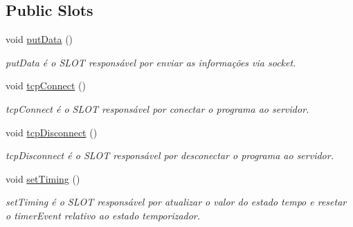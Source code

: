\subsection*{Public Slots}
\begin{DoxyCompactItemize}
\item 
\mbox{\label{class_main_window_afdfeb13ec363b0eb8ecacaf0aa13b605}} 
void \mbox{\hyperlink{class_main_window_afdfeb13ec363b0eb8ecacaf0aa13b605}{put\+Data}} ()
\begin{DoxyCompactList}\small\item\em put\+Data é o S\+L\+OT responsável por enviar as informações via socket. \end{DoxyCompactList}\item 
\mbox{\label{class_main_window_ac5b669957c442b6eb68573dacfce33e1}} 
void \mbox{\hyperlink{class_main_window_ac5b669957c442b6eb68573dacfce33e1}{tcp\+Connect}} ()
\begin{DoxyCompactList}\small\item\em tcp\+Connect é o S\+L\+OT responsável por conectar o programa ao servidor. \end{DoxyCompactList}\item 
\mbox{\label{class_main_window_a4d22c4c7afc7ba0a2fa4c70515c85dda}} 
void \mbox{\hyperlink{class_main_window_a4d22c4c7afc7ba0a2fa4c70515c85dda}{tcp\+Disconnect}} ()
\begin{DoxyCompactList}\small\item\em tcp\+Disconnect é o S\+L\+OT responsável por desconectar o programa ao servidor. \end{DoxyCompactList}\item 
\mbox{\label{class_main_window_a380872c4aa4095322c798c8ea0ed357e}} 
void \mbox{\hyperlink{class_main_window_a380872c4aa4095322c798c8ea0ed357e}{set\+Timing}} ()
\begin{DoxyCompactList}\small\item\em set\+Timing é o S\+L\+OT responsável por atualizar o valor do estado tempo e resetar o timer\+Event relativo ao estado temporizador. \end{DoxyCompactList}\item 
\mbox{\label{class_main_window_ac4725e6ca6bdfe248d1d5843e44e13f1}} 

\end{DoxyCompactItemize}

